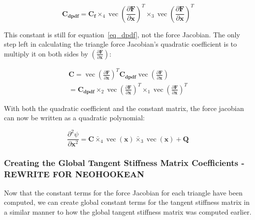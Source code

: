 \documentclass[twocolumn,10pt]{asme2ej}
\DeclareMathOperator{\vect}{vec}
\begin{document}
\begin{equation}
\bm{C_{dpdf}}  = \bm{C_f} \times_4 \vect \left( \frac{\partial \bm{F}}{\partial \bm{x}} \right)^T \times_3 \vect \left( \frac{\partial \bm{F}}{\partial \bm{x}}\right)^T
\end{equation}

This constant is still for equation~\ref{eq_dpdf}, not the force Jacobian. The only step left in calculating the triangle force Jacobian's quadratic coefficient is to multiply it on both sides by $\left(\frac{\partial \bm{F}}{\partial \bm{x}}\right)$:

\begin{multline}
\bm{C}  = \vect \left( \frac{\partial \bm{F}}{\partial \bm{x}} \right)^T \bm{C_{dpdf}} \vect \left( \frac{\partial \bm{F}}{\partial \bm{x}} \right)
\\ = \bm{C_{dpdf}} \times_2 \vect \left( \frac{\partial \bm{F}}{\partial \bm{x}} \right)^T \times_1 \vect \left( \frac{\partial \bm{F}}{\partial \bm{x}}\right)^T
\end{multline}

With both the quadratic coefficient and the constant matrix, the force jacobian can now be written as a quadratic polynomial:

\begin{equation}
\frac{\partial^2 \psi}{\partial \bm{x}^2} = \bm{C} \bar{\times}_4 \vect (\bm{x}) \bar{\times}_3 \vect (\bm{x}) + \bm{Q}
\label{eq_unreducedQuadratic}
\end{equation}

\subsubsection{Creating the Global Tangent Stiffness Matrix Coefficients  - REWRITE FOR NEOHOOKEAN}

Now that the constant terms for the force Jacobian for each triangle have been computed, we can create global constant terms for the tangent stiffness matrix in a similar manner to how the global tangent stiffness matrix was computed earlier.
\end{document}
